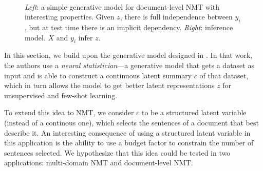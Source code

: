 \begin{figure}[t]
    \centering
    ~

    \caption{{\it Left}: a simple generative model for document-level
        NMT with interesting properties. Given $z$, there is full
        independence between $y_i$, but at test time there is an implicit
        dependency.
            {\it Right}: inference model. $X$ and $y_i$ infer $z$.}
    \label{fig:doclevel}
\end{figure}

In this section, we build upon the generative model designed in
\citet{edwards2017prociclr}. In that work, the authors use a {\it
        neural statistician}---a generative model that gets a dataset as
input and is able to construct a continuous latent summary $c$ of
that dataset, which in turn allows the model to get better latent
representations $z$ for unsupervised and few-shot learning.

To extend this idea to NMT, we consider $c$ to be a structured latent
variable (instead of a continous one), which selects the sentences of
a document that best describe it. An interesting consequence of using
a structured latent variable in this application is the ability to
use a budget factor to constrain the number of sentences selected. We
hypothesize that this idea could be tested in two applications:
multi-domain NMT and document-level NMT.


